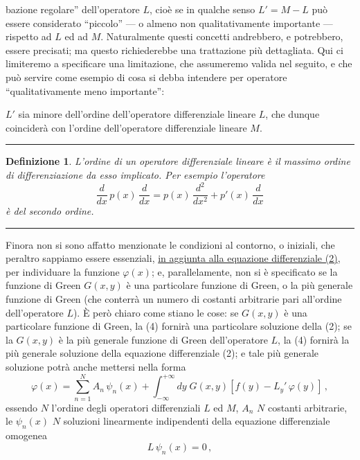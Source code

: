 \documentclass[11pt, a4paper]{book}
\numberwithin{equation}{section}
\newtheorem{definizione}{Definizione}[section]
\begin{document}

bazione regolare'' dell'operatore $L$, cioè se in qualche senso $L' = M - L$ può essere considerato ``piccolo'' --- o almeno non qualitativamente importante --- rispetto ad $L$ ed ad $M$. Naturalmente questi concetti andrebbero, e potrebbero, essere precisati; ma questo richiederebbe una trattazione più dettagliata. Qui ci limiteremo a specificare una limitazione, che assumeremo valida nel seguito, e che può servire come esempio di cosa si debba intendere per operatore ``qualitativamente meno importante'':

$L'$ sia minore dell'ordine dell'operatore differenziale lineare $L$, che dunque coinciderà con l'ordine dell'operatore differenziale lineare $M$.

\noindent\rule{\linewidth}{0.4pt}

\begin{definizione}
L'ordine di un operatore differenziale lineare è il massimo ordine di differenziazione da esso implicato. Per esempio l'operatore
\[
\frac{d}{dx}\,p(x)\,\frac{d}{dx} = p(x)\,\frac{d^2}{dx^2} + p'(x)\,\frac{d}{dx}
\]
è del secondo ordine.
\end{definizione}

\noindent\rule{\linewidth}{0.4pt}

Finora non si sono affatto menzionate le condizioni al contorno, o iniziali, che peraltro sappiamo essere essenziali, \underline{in aggiunta alla equazione differenziale (2)}, per individuare la funzione $\varphi(x)$; e, parallelamente, non si è specificato se la funzione di Green $G(x,y)$ è una particolare funzione di Green, o la più generale funzione di Green (che conterrà un numero di costanti arbitrarie pari all'ordine dell'operatore $L$). È però chiaro come stiano le cose: se $G(x,y)$ è una particolare funzione di Green, la (4) fornirà una particolare soluzione della (2); se la $G(x,y)$ è la più generale funzione di Green dell'operatore $L$, la (4) fornirà la più generale soluzione della equazione differenziale (2); e tale più generale soluzione potrà anche mettersi nella forma
\begin{equation}
\tag{5} \varphi(x) = \sum_{n=1}^{N} A_n\,\psi_n(x) + \int_{-\infty}^{+\infty} dy\; G(x,y)\left[f(y) - L_y'\,\varphi(y)\right]\,,
\end{equation}
essendo $N$ l'ordine degli operatori differenziali $L$ ed $M$, $A_n$ $N$ costanti arbitrarie, le $\psi_n(x)$ $N$ soluzioni linearmente indipendenti della equazione differenziale omogenea
\begin{equation}
\tag{6} L\,\psi_n(x) = 0\,,
\end{equation}
\end{document}
